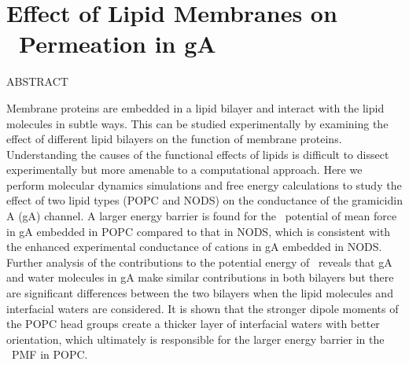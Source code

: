 \chapter{Effect of Lipid Membranes on \K\ Permeation in gA}
\label{chap:gA}
ABSTRACT \newline

Membrane proteins are embedded in a lipid bilayer and interact with the lipid molecules 
in subtle ways. This can be studied experimentally by examining the effect of different 
lipid bilayers on the function of membrane proteins. Understanding the causes of the 
functional effects of lipids is difficult to dissect experimentally but more amenable to 
a computational approach. Here we perform molecular dynamics simulations and free energy 
calculations to study the effect of two lipid types (POPC and NODS) on the conductance 
of the gramicidin A (gA) channel. A larger energy barrier is found for the \K\ potential 
of mean force in gA embedded in POPC compared to that in NODS, which is consistent with 
the enhanced experimental conductance of cations in gA embedded in NODS. Further analysis 
of the contributions to the potential energy of \K\ reveals that gA and water molecules in 
gA make similar contributions in both bilayers but there are significant differences 
between the two bilayers when the lipid molecules and interfacial waters are considered. 
It is shown that the stronger dipole moments of the POPC head groups create a thicker 
layer of interfacial waters with better orientation, which ultimately is responsible for 
the larger energy barrier in the \K\ PMF in POPC.

\newpage
